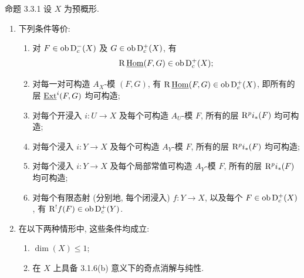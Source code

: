 \begin{statement}{命题 3.3.1}
设 $X$ 为预概形.
\begin{enumerate}[label=\alph*)]
\item 下列条件等价:
\begin{enumerate}[label=(\roman*)]
\item 对 $F\in\operatorname{ob}\mathrm{D}_c^-(X)$ 及 $G\in\operatorname{ob}\mathrm{D}_c^+(X)$, 有
\[
   \mathrm R\,\underline{\operatorname{Hom}}(F,G)\in\operatorname{ob}\mathrm{D}_c^+(X);
\]
\item[(i bis)] 对每一对可构造 $A_X$-模 $(F,G)$, 有 $\mathrm R\,\underline{\operatorname{Hom}}(F,G)\in\operatorname{ob}\mathrm{D}_c^+(X)$, 即所有的层 $\underline{\operatorname{Ext}}^i(F,G)$ 均可构造;
\item 对每个开浸入 $i:U\to X$ 及每个可构造 $A_U$-模 $F$, 所有的层 $\mathrm R^pi_*(F)$ 均可构造;
\item[(ii bis)] 对每个浸入 $i:Y\to X$ 及每个可构造 $A_Y$-模 $F$, 所有的层 $\mathrm R^pi_*(F)$ 均可构造;
\item[(ii ter)] 对每个浸入 $i:Y\to X$ 及每个局部常值可构造 $A_Y$-模 $F$, 所有的层 $\mathrm R^pi_*(F)$ 均可构造;
\item 对每个有限态射 (分别地, 每个闭浸入) $f:Y\to X$, 以及每个 $F\in\operatorname{ob}\mathrm{D}_c^+(X)$, 有 $\mathrm R^!f(F)\in\operatorname{ob}\mathrm{D}_c^+(Y)$.
\end{enumerate}
\item 在以下两种情形中, 这些条件均成立:
\begin{enumerate}[label=(\roman*)]
\item $\dim(X)\le1$;
\item 在 $X$ 上具备 3.1.6(b) 意义下的奇点消解与纯性.
\end{enumerate}
\end{enumerate}
\end{statement}

